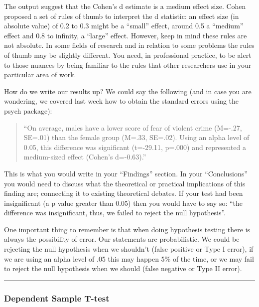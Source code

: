 \documentclass[
]{book}
\begin{document}
The output suggest that the Cohen's d estimate is a medium effect size. Cohen proposed a set of rules of thumb to interpret the d statistic: an effect size (in absolute value) of 0.2 to 0.3 might be a ``small'' effect, around 0.5 a ``medium'' effect and 0.8 to infinity, a ``large'' effect. However, keep in mind these rules are not absolute. In some fields of research and in relation to some problems the rules of thumb may be slightly different. You need, in professional practice, to be alert to those nuances by being familiar to the rules that other researchers use in your particular area of work.

How do we write our results up? We could say the following (and in case you are wondering, we covered last week how to obtain the standard errors using the psych package):

\begin{quote}
``On average, males have a lower score of fear of violent crime (M=-.27, SE=.01) than the female group (M=.33, SE=.02). Using an alpha level of 0.05, this difference was significant (t=-29.11, p=.000) and represented a medium-sized effect (Cohen's d=-0.63).''
\end{quote}

This is what you would write in your ``Findings'' section. In your ``Conclusions'' you would need to discuss what the theoretical or practical implications of this finding are; connecting it to existing theoretical debates. If your test had been insignificant (a p value greater than 0.05) then you would have to say so: ``the difference was insignificant, thus, we failed to reject the null hypothesis''.

One important thing to remember is that when doing hypothesis testing there is always the possibility of error. Our statements are probabilistic. We could be rejecting the null hypothesis when we shouldn't (false positive or Type I error), if we are using an alpha level of .05 this may happen 5\% of the time, or we may fail to reject the null hypothesis when we should (false negative or Type II error).

\begin{center}\rule{0.5\linewidth}{0.5pt}\end{center}

\hypertarget{dependent-sample-t-test}{%
\subsubsection{Dependent Sample T-test}\label{dependent-sample-t-test}}
\end{document}
